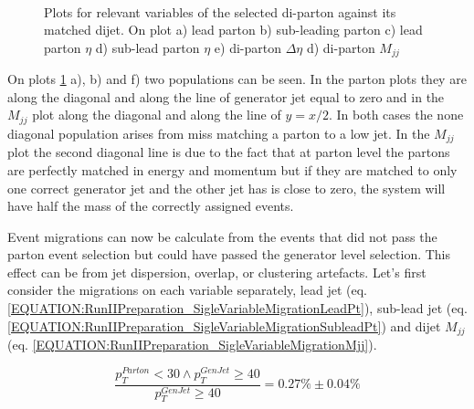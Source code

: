 \begin{figure}[!htp]
\\
\caption[]{Plots for relevant variables of the selected di-parton against its matched dijet. On plot a) lead parton \pt b) sub-leading parton \pt c) lead parton $\eta$ d) sub-lead parton $\eta$ e) di-parton $\Delta\eta$ d) di-parton $M_{jj}$}
\label{FIGURE:RunIIPreparation_VariablesPartonVsGenJet}
\end{figure}

On plots \ref{FIGURE:RunIIPreparation_VariablesPartonVsGenJet} a), b) and f) two populations can be seen. In the parton \pt plots they are along the diagonal and along the line of generator jet \pt equal to zero and in the $M_{jj}$ plot along the diagonal and along the line of $y=x/2$. In both cases the none diagonal population arises from miss matching a parton to a low \pt jet. In the $M_{jj}$ plot the second diagonal line is due to the fact that at parton level the partons are perfectly matched in energy and momentum but if they are matched to only one correct generator jet and the other jet has \pt is close to zero, the system will have half the mass of the correctly assigned events.

Event migrations can now be calculate from the events that did not pass the parton event selection but could have passed the generator level selection. This effect can be from jet dispersion, overlap, or clustering artefacts. Let's first consider the migrations on each variable separately, lead jet \pt (eq. \ref{EQUATION:RunIIPreparation_SigleVariableMigrationLeadPt}), sub-lead jet \pt (eq. \ref{EQUATION:RunIIPreparation_SigleVariableMigrationSubleadPt}) and dijet $M_{jj}$ (eq. \ref{EQUATION:RunIIPreparation_SigleVariableMigrationMjj}).

\small
\begin{equation}
\label{EQUATION:RunIIPreparation_SigleVariableMigrationLeadPt}
\frac{p_{T}^{Parton}<30 \wedge p_{T}^{GenJet} \geq 40}{p_{T}^{GenJet} \geq 40}=0.27\% \pm 0.04\%
\end{equation}

